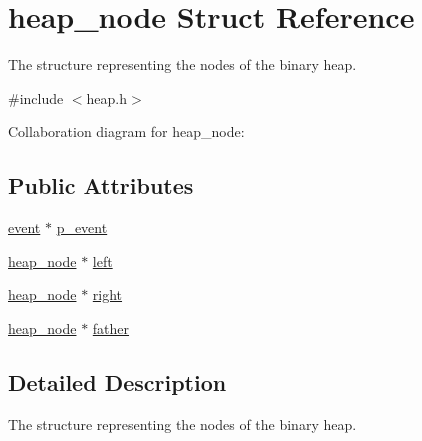 \hypertarget{structheap__node}{\section{heap\-\_\-node Struct Reference}
\label{structheap__node}
}


The structure representing the nodes of the binary heap.  




{\ttfamily \#include $<$heap.\-h$>$}



Collaboration diagram for heap\-\_\-node\-:
\subsection*{Public Attributes}
\begin{DoxyCompactItemize}
\item 
\hyperlink{structevent}{event} $\ast$ \hyperlink{structheap__node_a79b2fa864243fdcb2cae3e7d286e9709}{p\-\_\-event}
\item 
\hyperlink{structheap__node}{heap\-\_\-node} $\ast$ \hyperlink{structheap__node_a14e93b10342511f5f5dfa9554c4762c0}{left}
\item 
\hyperlink{structheap__node}{heap\-\_\-node} $\ast$ \hyperlink{structheap__node_a43d2d8faac7921c4c08cff948c29373b}{right}
\item 
\hyperlink{structheap__node}{heap\-\_\-node} $\ast$ \hyperlink{structheap__node_a7194b57dca6a769e6453844acc2b7d92}{father}
\end{DoxyCompactItemize}


\subsection{Detailed Description}
The structure representing the nodes of the binary heap. 

